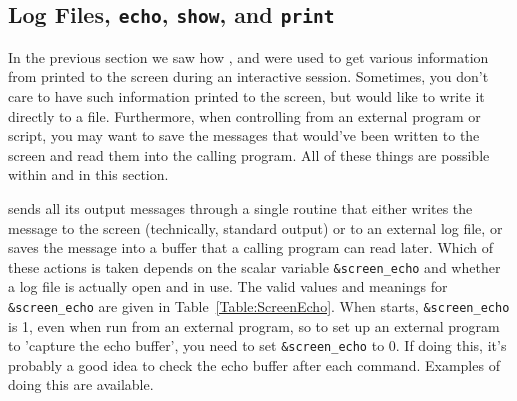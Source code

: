 \subsection{Log Files, {\texttt{echo}}, {\texttt{show}}, and {\texttt{print}}}
\label{Ch:Structure-Logging}

{ }
In the previous section we saw how {}, {} and
{} were used to get various information from {\ifeffit} printed
to the screen during an interactive session.  Sometimes, you don't care to
have such information printed to the screen, but would like to write it
directly to a file.  Furthermore, when controlling {\ifeffit} from an
external program or script, you may want to save the messages that would've
been written to the screen and read them into the calling program.  All of
these things are possible within {\ifeffit} and in this section.
{}

{\ifeffit} sends all its output messages through a single routine that
either writes the message to the screen (technically, standard output) or
to an external log file, or saves the message into a buffer that a calling
program can read later.  Which of these actions is taken depends on the
scalar variable {\tt{\&screen\_echo}} and whether a log file is actually
open and in use.  The valid values and meanings for {\tt{\&screen\_echo}}
are given in Table~\ref{Table:ScreenEcho}.  When {\ifeffit} starts,
{\tt{\&screen\_echo}} is 1, even when run from an external program, so to
set up an external program to 'capture the echo buffer', you need to set
{\tt{\&screen\_echo}} to 0.  If doing this, it's probably a good idea to
check the echo buffer after each command.  Examples of doing this are
available.

